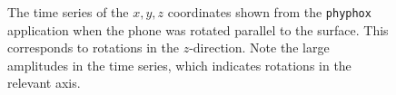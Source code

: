 \documentclass[a4paper]{report}
\numberwithin{equation}{section}
\begin{document}
\begin{figure}[hbt!]
	\centering
	\quad

	\caption{The time series of the $x, y, z$ coordinates shown from the \texttt{phyphox} application when 
            the phone was rotated parallel to the surface. This corresponds to rotations in the $z$-direction. Note the large amplitudes in 
            the time series, which indicates rotations in the relevant axis. }
	\label{fig:gyro_plot_z}
\end{figure}
\end{document}
